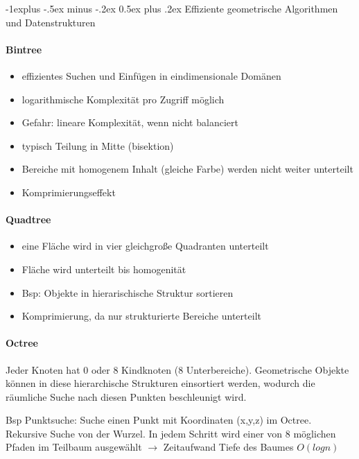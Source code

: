 \documentclass[10pt,landscape]{article}
\makeatletter
\renewcommand{\subsection}{\@startsection{subsection}{2}{0mm}%
                                {-1explus -.5ex minus -.2ex}%
                                {0.5ex plus .2ex}%
                                {\normalfont\normalsize\bfseries}}
\makeatother
\begin{document}
\begin{multicols}{3}
\subsection{Effiziente geometrische Algorithmen und Datenstrukturen}
\paragraph{Bintree}
\begin{itemize}
  \item effizientes Suchen und Einfügen in eindimensionale Domänen
  \item logarithmische Komplexität pro Zugriff möglich
  \item Gefahr: lineare Komplexität, wenn nicht balanciert
  \item typisch Teilung in Mitte (bisektion)
  \item Bereiche mit homogenem Inhalt (gleiche Farbe) werden nicht weiter unterteilt
  \item Komprimierungseffekt
\end{itemize}

\paragraph{Quadtree}
\begin{itemize}
  \item eine Fläche wird in vier gleichgroße Quadranten unterteilt
  \item Fläche wird unterteilt bis homogenität
  \item Bsp: Objekte in hierarischische Struktur sortieren
  \item Komprimierung, da nur strukturierte Bereiche unterteilt
\end{itemize}

\paragraph{Octree}
Jeder Knoten hat 0 oder 8 Kindknoten (8 Unterbereiche). Geometrische Objekte können in diese hierarchische Strukturen einsortiert werden, wodurch die räumliche Suche nach diesen Punkten beschleunigt wird.

Bsp Punktsuche: Suche einen Punkt mit Koordinaten (x,y,z) im Octree. Rekursive Suche von der Wurzel. In jedem Schritt wird einer von 8 möglichen Pfaden im Teilbaum ausgewählt $\rightarrow$ Zeitaufwand Tiefe des Baumes $O(log n)$


\end{multicols}
\end{document}

